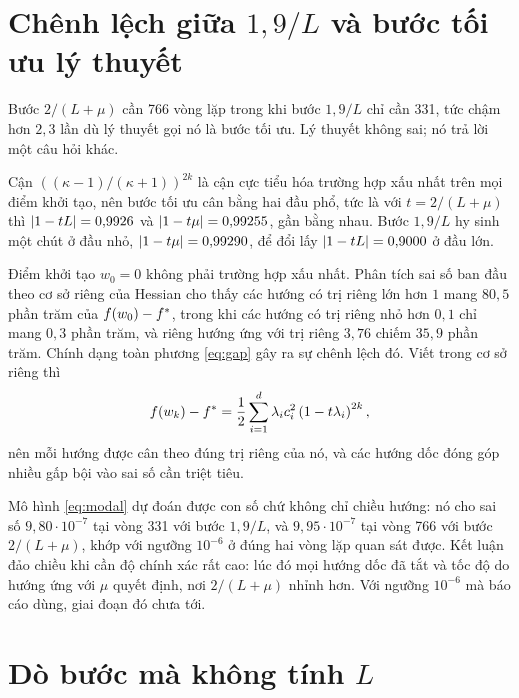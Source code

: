 \documentclass[12pt, a4paper, oneside]{report}
\theoremstyle{definition}
\begin{document}

\section{Chênh lệch giữa \texorpdfstring{$1{,}9/L$}{1,9/L} và bước tối ưu lý thuyết}

Bước $2/(L+\mu)$ cần 766 vòng lặp trong khi bước $1{,}9/L$ chỉ cần 331, tức chậm
hơn $2{,}3$ lần dù lý thuyết gọi nó là bước tối ưu. Lý thuyết không sai; nó trả lời một câu hỏi khác.

Cận $\left((\kappa-1)/(\kappa+1)\right)^{2k}$ là cận cực tiểu hóa trường hợp xấu
nhất trên mọi điểm khởi tạo, nên bước tối ưu cân bằng hai đầu phổ, tức là với
$t = 2/(L+\mu)$ thì $\lvert1 - tL\rvert = 0{,}9926$ và $\lvert1 - t\mu\rvert = 0{,}99255$,
gần bằng nhau. Bước $1{,}9/L$ hy sinh một chút ở đầu nhỏ, $\lvert1-t\mu\rvert =
0{,}99290$, để đổi lấy $\lvert1 - tL\rvert = 0{,}9000$ ở đầu lớn.

Điểm khởi tạo $w_{0} = 0$ không phải trường hợp xấu nhất. Phân tích sai số ban
đầu theo cơ sở riêng của Hessian cho thấy các hướng có trị riêng lớn hơn $1$ mang
$80{,}5$ phần trăm của $f(w_{0}) - f^{*}$, trong khi các hướng có trị riêng nhỏ
hơn $0{,}1$ chỉ mang $0{,}3$ phần trăm, và riêng hướng ứng với trị riêng $3{,}76$
chiếm $35{,}9$ phần trăm. Chính dạng toàn phương \eqref{eq:gap} gây ra sự chênh
lệch đó. Viết trong cơ sở riêng thì
\begin{equation}\label{eq:modal}
  f(w_k) - f^{*} = \frac{1}{2} \sum_{i=1}^{d} \lambda_{i} c_{i}^{2} \left( 1 - t \lambda_{i} \right)^{2k},
\end{equation}
nên mỗi hướng được cân theo đúng trị riêng của nó, và các hướng dốc đóng góp
nhiều gấp bội vào sai số cần triệt tiêu.

Mô hình \eqref{eq:modal} dự đoán được con số chứ không chỉ chiều hướng: nó cho
sai số $9{,}80 \cdot 10^{-7}$ tại vòng 331 với bước $1{,}9/L$, và
$9{,}95 \cdot 10^{-7}$ tại vòng 766 với bước $2/(L+\mu)$, khớp với ngưỡng
$10^{-6}$ ở đúng hai vòng lặp quan sát được. Kết luận đảo chiều khi cần độ chính
xác rất cao: lúc đó mọi hướng dốc đã tắt và tốc độ do hướng ứng với $\mu$ quyết
định, nơi $2/(L+\mu)$ nhỉnh hơn. Với ngưỡng $10^{-6}$ mà báo cáo dùng, giai đoạn
đó chưa tới.

\section{Dò bước mà không tính \texorpdfstring{$L$}{L}}
\end{document}
